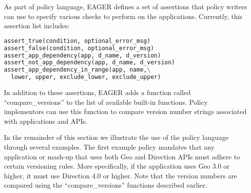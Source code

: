 As part of policy language, EAGER
defines a set of assertions that policy writers can use to specify various 
checks to perform on the applications. 
Currently, this assertion list includes:

\vspace{0.05in}
{\footnotesize 
\begin{lstlisting}[language=Python, frame=single]
assert_true(condition, optional_error_msg)
assert_false(condition, optional_error_msg)
assert_app_dependency(app, d_name, d_version)
assert_not_app_dependency(app, d_name, d_version)
assert_app_dependency_in_range(app, name,\
  lower, upper, exclude_lower, exclude_upper)
\end{lstlisting}
}


In addition to these assertions, EAGER adds a function
called ``compare\_versions'' to the list 
of available built-in functions. Policy
implementors can use this function to compare version 
number strings associated with
applications and APIs.


In the remainder of this section we illustrate the use of the policy language
through several examples.
The first example policy mandates that any application or mash-up
that uses both Geo and Direction APIs must adhere to certain versioning 
rules. More specifically, if the application uses Geo 3.0 or higher, it must use
Direction 4.0 or higher. Note that the version numbers are compared using the
``compare\_versions'' functions described earlier.

